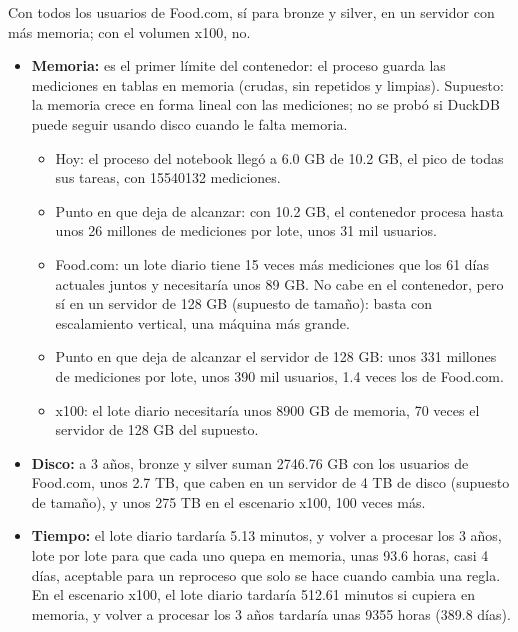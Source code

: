 \documentclass[11pt]{article}
\begin{document}
 Con todos los usuarios de Food.com, sí para
bronze y silver, en un servidor con más memoria; con el volumen x100, no.
\begin{itemize}
  \item \textbf{Memoria:} es el primer límite del contenedor: el proceso
  guarda las mediciones en tablas en memoria (crudas, sin repetidos y limpias). Supuesto:
  la memoria crece en forma lineal con las mediciones; no se probó si DuckDB
  puede seguir usando disco cuando le falta memoria.
  \begin{itemize}
    \item Hoy: el proceso del notebook llegó a 6.0 GB de 10.2 GB, el pico de
    todas sus tareas, con 15540132 mediciones.
    \item Punto en que deja de alcanzar: con 10.2 GB, el contenedor procesa
    hasta unos 26 millones de mediciones por lote, unos 31 mil usuarios.
    \item Food.com: un lote diario tiene 15 veces más mediciones que los 61
    días actuales juntos y necesitaría unos 89 GB. No cabe en el contenedor, pero sí en un servidor de
    128 GB (supuesto de tamaño): basta con escalamiento vertical, una máquina más grande.
    \item Punto en que deja de alcanzar el servidor de 128 GB: unos 331
    millones de mediciones por lote, unos 390 mil usuarios, 1.4 veces los de
    Food.com.
    \item x100: el lote diario necesitaría unos 8900 GB de memoria, 70
    veces el servidor de 128 GB del supuesto.
  \end{itemize}
  \item \textbf{Disco:} a 3 años, bronze y silver suman 2746.76 GB con los
  usuarios de Food.com, unos 2.7 TB, que caben en un servidor de 4 TB de
  disco (supuesto de tamaño), y unos 275
  TB en el escenario x100, 100 veces más.
  \item \textbf{Tiempo:} el lote diario tardaría 5.13 minutos, y volver a
  procesar los 3 años, lote por lote para que cada uno quepa en memoria, unas
  93.6 horas, casi 4 días, aceptable para un reproceso
  que solo se hace cuando cambia una regla. En el escenario x100, el lote diario
  tardaría 512.61 minutos si cupiera en memoria, y volver a procesar los 3 años tardaría unas 9355 horas (389.8 días).
\end{itemize}
\end{document}
